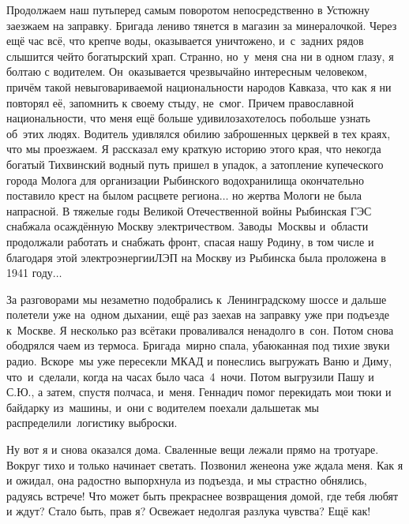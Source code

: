 Продолжаем наш путь\mdash перед самым поворотом непосредственно в Устюжну заезжаем на заправку. Бригада лениво тянется в магазин за минералочкой. Через ещё час всё, что крепче воды, оказывается уничтожено, и~с~задних рядов слышится чей\sdash то богатырский храп. Странно, но~у~меня сна ни в одном глазу, я болтаю с водителем. Он~оказывается чрезвычайно интересным человеком, причём такой невыговариваемой национальности народов Кавказа, что как я ни повторял её, запомнить к своему стыду, не~смог. Причем православной национальности, что меня ещё больше удивило\mdash захотелось побольше узнать об~этих людях. Водитель удивлялся обилию заброшенных церквей в тех краях, что мы проезжаем. Я рассказал ему краткую историю этого края, что некогда богатый Тихвинский водный путь пришел в упадок, а затопление купеческого города Молога для организации Рыбинского водохранилища окончательно поставило крест на былом расцвете региона$\ldots$ но жертва Мологи не была напрасной. В тяжелые годы Великой Отечественной войны Рыбинская ГЭС снабжала осаждённую Москву электричеством. Заводы~Москвы и~области продолжали работать и снабжать фронт, спасая нашу Родину, в том числе и благодаря этой электроэнергии\mdash ЛЭП на Москву из Рыбинска была проложена в 1941 году$\ldots$ 

За разговорами мы незаметно подобрались к~Ленинградскому шоссе и дальше полетели уже на~одном дыхании, ещё раз заехав на заправку уже при подъезде к~Москве. Я несколько раз всё\sdash таки проваливался ненадолго в~сон. Потом снова ободрялся чаем из термоса. Бригада~мирно спала, убаюканная под тихие звуки радио. Вскоре~мы уже пересекли МКАД и понеслись выгружать Ваню и Диму, что~и~сделали, когда на часах было часа~4~ночи. Потом выгрузили Пашу и С.Ю., а затем, спустя полчаса, и~меня. Геннадич помог перекидать мои тюки и байдарку из~машины, и~они с водителем поехали дальше\mdash так мы распределили~логистику выброски. 

Ну вот я и снова оказался дома. Сваленные вещи лежали прямо на тротуаре. Вокруг тихо и только начинает светать. Позвонил жене\mdash она уже ждала меня. Как я и ожидал, она радостно выпорхнула из подъезда, и мы страстно обнялись, радуясь встрече! Что может быть прекраснее возвращения домой, где тебя любят и ждут? Стало быть, прав я? Освежает недолгая разлука чувства? Ещё как! 

\begin{center}
\end{center}
